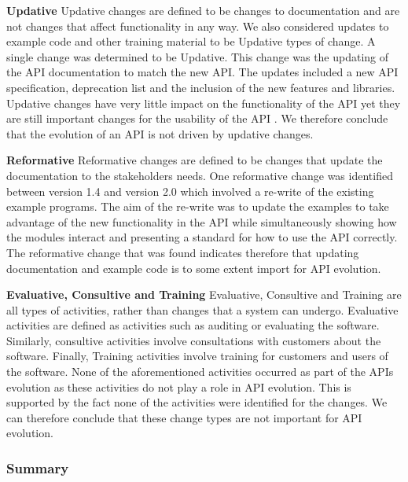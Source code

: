 \documentclass{sig-alternate}
\begin{document}
\smallskip \noindent
\textbf{Updative  }
Updative changes are defined to be changes to documentation and are not changes that affect functionality in any way. We also considered updates to example code and other training material to be Updative types of change.
A single change was determined to be Updative. This change was the updating of the API documentation to match the new API. The updates included a new API specification, deprecation list and the inclusion of the new features and libraries.
Updative changes have very little impact on the functionality of the API yet they are still important changes for the usability of the API \cite{shi2011empirical}. We therefore conclude that the evolution of an API is not driven by updative changes.

\smallskip \noindent
\textbf{Reformative  }
Reformative changes are defined to be changes that update the documentation to the stakeholders needs.
One reformative change was identified between version 1.4 and version 2.0 which involved a re-write of the existing example programs. The aim of the re-write was to update the examples to take advantage of the new functionality in the API while simultaneously showing how the modules interact and presenting a standard for how to use the API correctly.
The reformative change that was found indicates therefore that updating documentation and example code is to some extent import for API evolution.

\smallskip \noindent
\textbf{Evaluative, Consultive and Training  }
Evaluative, Consultive and Training are all types of activities, rather than changes that a system can undergo. Evaluative activities are defined as activities such as auditing or evaluating the software. Similarly, consultive activities involve consultations with customers about the software. Finally, Training activities involve training for customers and users of the software.
None of the aforementioned activities occurred as part of the APIs evolution as these activities do not play a role in API evolution. This is supported by the fact none of the activities were identified for the changes.
We can therefore conclude that these change types are not important for API evolution.

\subsubsection{Summary}
\end{document}
